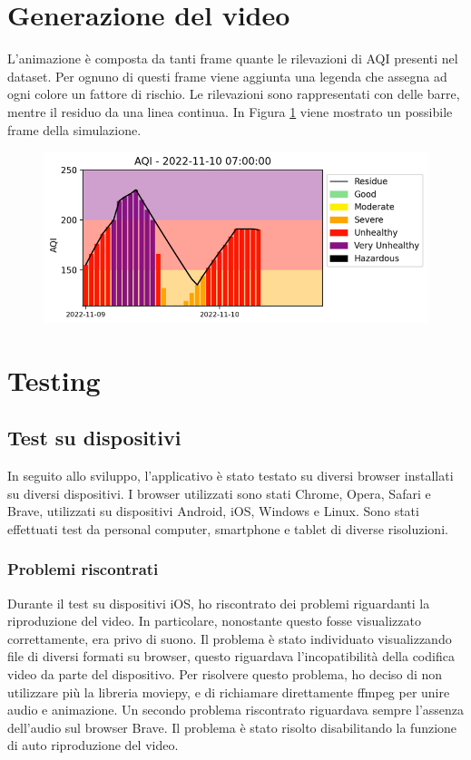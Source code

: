 \section{Generazione del video}
L'animazione è composta da tanti frame quante le rilevazioni di AQI presenti nel dataset.
Per ognuno di questi frame viene aggiunta una legenda che assegna ad ogni colore un fattore di rischio.
Le rilevazioni sono rappresentati con delle barre, mentre il residuo da una linea continua.
In Figura \ref{fig:video} viene mostrato un possibile frame della simulazione.
\begin{figure}[h]
  \includegraphics[width=\linewidth]{img/video.PNG}
  \label{fig:video}
\end{figure}



\section{Testing}
\subsection{Test su dispositivi}
In seguito allo sviluppo, l'applicativo è stato testato su diversi browser installati su diversi dispositivi.
I browser utilizzati sono stati Chrome, Opera, Safari e Brave, utilizzati su dispositivi Android, iOS, Windows e Linux.
Sono stati effettuati test da personal computer, smartphone e tablet di diverse risoluzioni.
\subsubsection{Problemi riscontrati}
Durante il test su dispositivi iOS, ho riscontrato dei problemi riguardanti la riproduzione del video.
In particolare, nonostante questo fosse visualizzato correttamente, era privo di suono.
Il problema è stato individuato visualizzando file di diversi formati su browser, questo riguardava l'incopatibilità della codifica video da parte del dispositivo.
Per risolvere questo problema, ho deciso di non utilizzare più la libreria moviepy, e di richiamare direttamente ffmpeg per unire audio e animazione.
Un secondo problema riscontrato riguardava sempre l'assenza dell'audio sul browser Brave. Il problema è stato risolto disabilitando la funzione di auto riproduzione del video. 

